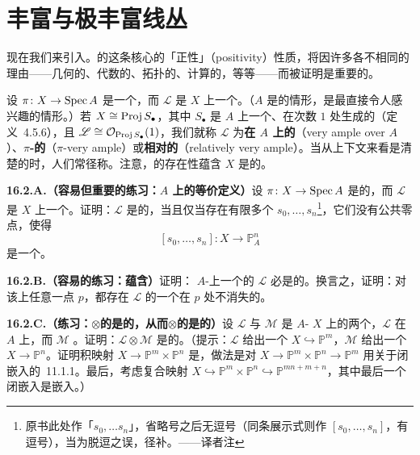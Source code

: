 
\section{丰富与极丰富线丛}

现在我们来引入\trAmpleness。\trLineBundle{}的这条核心的「正性」（positivity）性质，将因许多各不相同的理由——几何的、代数的、拓扑的、计算的，等等——而被证明是重要的。

设 $\pi\colon X\to\operatorname{Spec} A$ 是一个\trMorphism，而 $\mathscr{L}$ 是 $X$ 上一个\trInvertibleSheaf。（$A$ 是\trField{}的情形，是最直接令人感兴趣的情形。）若 $X\cong\operatorname{Proj} S_\bullet$，其中 $S_\bullet$ 是 $A$ 上一个\trFinitelyGenerated{}、在次数 $1$ 处生成的\trGradedRing（\mbox{定义~4.5.6}），且 $\mathscr{L}\cong\mathcal{O}_{\operatorname{Proj} S_\bullet}(1)$，我们就称 $\mathscr{L}$ 为\textbf{在 $A$ 上\trVeryAmple{}的}（very ample over $A$）、\textbf{$\pi$-\trVeryAmple{}的}（$\pi$-very ample）或\textbf{相对\trVeryAmple{}的}（relatively very ample）。当\trStructureMorphism{}从上下文来看是清楚的时，人们常径称\textbf{\trVeryAmple}。注意，\trVeryAmple\trLineBundle{}的存在性蕴含 $X$ 是\trProjective{}的。

\textbf{16.2.A.（容易但重要的练习：$A$ 上\trVeryAmple{}的等价定义）}\quad 设 $\pi\colon X\to\operatorname{Spec} A$ 是\trProper{}的，而 $\mathscr{L}$ 是 $X$ 上一个\trInvertibleSheaf。证明：$\mathscr{L}$ 是\trVeryAmple{}的，当且仅当存在有限多个\trGlobalSections{} $s_0,\dots,s_n$\footnote{原书此处作「$s_0,\dots s_n$」，省略号之后无逗号（同条展示式则作 $[s_0,\dots,s_n]$，有逗号），当为脱逗之误，径补。——译者注}，它们没有公共零点，使得\trMorphism
\[
[s_0,\dots,s_n]\colon X\longrightarrow\mathbb{P}^n_A
\]
是一个\trClosedEmbedding。

\textbf{16.2.B.（容易的练习：\trVeryAmple{}蕴含\trBasePointFree）}\quad 证明：\trProper{} $A$-\trScheme{}上一个\trVeryAmple{}的\trInvertibleSheaf{} $\mathscr{L}$ 必是\trBasePointFree{}的。换言之，证明：对该\trScheme{}上任意一点 $p$，都存在 $\mathscr{L}$ 的一个在 $p$ 处不消失的\trSection。

\textbf{16.2.C.（练习：\trVeryAmple{}$\otimes$\trBasePointFree{}的是\trVeryAmple{}的，从而\trVeryAmple{}$\otimes$\trVeryAmple{}的是\trVeryAmple{}的）}\quad 设 $\mathscr{L}$ 与 $\mathscr{M}$ 是\trProper{} $A$-\trScheme{} $X$ 上的两个\trInvertibleSheaf，$\mathscr{L}$ 在 $A$ 上\trVeryAmple{}，而 $\mathscr{M}$ \trBasePointFree。证明：$\mathscr{L}\otimes\mathscr{M}$ 是\trVeryAmple{}的。（提示：$\mathscr{L}$ 给出一个\trClosedEmbedding{} $X\hookrightarrow\mathbb{P}^m$，$\mathscr{M}$ 给出一个\trMorphism{} $X\to\mathbb{P}^n$。证明积映射 $X\to\mathbb{P}^m\times\mathbb{P}^n$ 是\trClosedEmbedding，做法是对 $X\to\mathbb{P}^m\times\mathbb{P}^n\to\mathbb{P}^m$ 用关于闭嵌入的\trCancellationTheorem~11.1.1。最后，考虑复合映射 $X\hookrightarrow\mathbb{P}^m\times\mathbb{P}^n\hookrightarrow\mathbb{P}^{mn+m+n}$，其中最后一个闭嵌入是\trSegre{}嵌入。）

